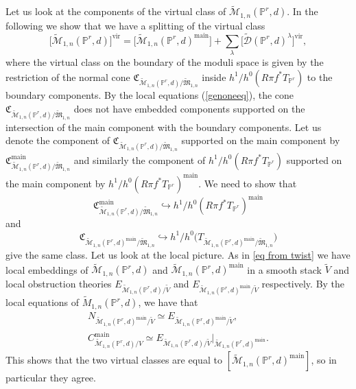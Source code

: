 \documentclass[pdftex]{sigma}
\numberwithin{equation}{section}
\newcommand{\vv}{\mathrm{vir}}
\newcommand{\PP}{\mathbb P}
\begin{document}
\begin{Example} Let us look at the components of the virtual class of $\widetilde{\mathcal{M}}_{1,n}(\PP^r,d)$. In the following we show that we have a splitting of the virtual class
\[\big[\widetilde{\mathcal{M}}_{1,n}(\PP^r,d)\big]^{\vv}=\big[\widetilde{\mathcal{M}}_{1,n} (\PP^r,d)^{\mathrm{main}}\big]+\sum_{\lambda}\big[\widetilde{\mathcal{D}}(\PP^r,d)^{\lambda}\big]^{\vv},
\]
where the virtual class on the boundary of the moduli space is given by the restriction of the normal cone $\mathfrak{C}_{\widetilde{\mathcal{M}}_{1,n}(\PP^r,d)/\widetilde{\mathfrak{M}}_{1,n}}$ inside $h^1/h^0(R\pi f^*T_{\PP^r})$ to the boundary components. By the local equations (\ref{genoneeq}), the cone $\mathfrak{C}_{\widetilde{\mathcal{M}}_{1,n}(\PP^r,d)/\widetilde{\mathfrak{M}}_{1,n}}$ does not have embedded components supported on the intersection of the main component with the boundary components. Let us denote the component of $\mathfrak{C}_{\widetilde{\mathcal{M}}_{1,n}(\PP^r,d)/\widetilde{\mathfrak{M}}_{1,n}}$ supported on the main component by $\mathfrak{C}^{\mathrm{main}}_{\widetilde{\mathcal{M}}_{1,n}(\PP^r,d)/\widetilde{\mathfrak{M}}_{1,n}}$ and similarly the component of $h^1/h^0(R\pi f^*T_{\PP^r})$ supported on the main component by $h^1/h^0(R\pi f^*T_{\PP^r})^{\mathrm{main}}$. We need to show that
\[\mathfrak{C}^{\mathrm{main}}_{\widetilde{\mathcal{M}}_{1,n}(\PP^r,d)/\widetilde{\mathfrak{M}}_{1,n}}\hookrightarrow h^1/h^0(R\pi f^*T_{\PP^r})^{\mathrm{main}}\]
 and
 \[\mathfrak{C}_{\widetilde{\mathcal{M}}_{1,n}(\PP^r,d)^{\mathrm{main}}/\widetilde{\mathfrak{M}}_{1,n}}\hookrightarrow h^1/h^0\big(T_{\widetilde{\mathcal{M}}_{1,n}(\PP^r,d)^{\mathrm{main}}/\widetilde{\mathfrak{M}}_{1,n}}\big)
 \]
 give the same class. Let us look at the local picture. As in \ref{eq from twist} we have local embeddings of $\widetilde{\mathcal{M}}_{1,n}(\PP^r,d)$ and $\widetilde{\mathcal{M}}_{1,n}(\PP^r,d)^{\mathrm{main}}$ in a smooth stack $\widetilde{V}$ and local obstruction theories $E_{\widetilde{\mathcal{M}}_{1,n}(\PP^r,d)/\widetilde{V}}$ and $E_{\widetilde{\mathcal{M}}_{1,n}(\PP^r,d)^{\mathrm{main}}/\widetilde{V}}$ respectively. By the local equations of $\widetilde{M}_{1,n}(\PP^r,d)$, we have that
\begin{gather*}
N_{\widetilde{\mathcal{M}}_{1,n}(\PP^r,d)^{\mathrm{main}}/\widetilde{V}}\simeq E_{\widetilde{\mathcal{M}}_{1,n}(\PP^r,d)^{\mathrm{main}}/\widetilde{V}},
\\
C_{\widetilde{\mathcal{M}}_{1,n}(\PP^r,d)/V}^{\mathrm{main}}\simeq E_{\widetilde{\mathcal{M}}_{1,n}(\PP^r,d)/\widetilde{V}}|_{\widetilde{\mathcal{M}}_{1,n} (\PP^r,d)^{\mathrm{main}}}.
\end{gather*}
This shows that the two virtual classes are equal to $[\widetilde{\mathcal{M}}_{1,n}(\PP^r,d)^{\mathrm{main}}]$, so in particular they agree.


\end{Example}
\end{document}
